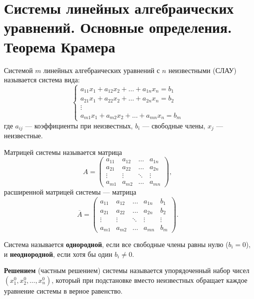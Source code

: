 \section{Системы линейных алгебраических уравнений. Основные определения. Теорема Крамера}

\begin{definition}
Системой $m$ линейных алгебраических уравнений с $n$ неизвестными (СЛАУ) называется система вида:
\[
\begin{cases}
a_{11}x_1 + a_{12}x_2 + \ldots + a_{1n}x_n = b_1 \\
a_{21}x_1 + a_{22}x_2 + \ldots + a_{2n}x_n = b_2 \\
\vdots \\
a_{m1}x_1 + a_{m2}x_2 + \ldots + a_{mn}x_n = b_m
\end{cases}
\]
где $a_{ij}$ --- коэффициенты при неизвестных, $b_i$ --- свободные члены, $x_j$ --- неизвестные.
\end{definition}

\begin{definition}
Матрицей системы называется матрица
\[
A = \begin{pmatrix}
a_{11} & a_{12} & \ldots & a_{1n} \\
a_{21} & a_{22} & \ldots & a_{2n} \\
\vdots & \vdots & \ddots & \vdots \\
a_{m1} & a_{m2} & \ldots & a_{mn}
\end{pmatrix},
\]
расширенной матрицей системы --- матрица
\[
\overline{A} = \left(\begin{array}{cccc|c}
a_{11} & a_{12} & \ldots & a_{1n} & b_1 \\
a_{21} & a_{22} & \ldots & a_{2n} & b_2 \\
\vdots & \vdots & \ddots & \vdots & \vdots \\
a_{m1} & a_{m2} & \ldots & a_{mn} & b_m
\end{array}\right).
\]
\end{definition}

\begin{definition}
Система называется \textbf{однородной}, если все свободные члены равны нулю ($b_i = 0$), и \textbf{неоднородной}, если хотя бы один $b_i \neq 0$.
\end{definition}

\begin{definition}
\textbf{Решением} (частным решением) системы называется упорядоченный набор чисел $(x_1^0, x_2^0, \ldots, x_n^0)$, который при подстановке вместо неизвестных обращает каждое уравнение системы в верное равенство.
\end{definition}

